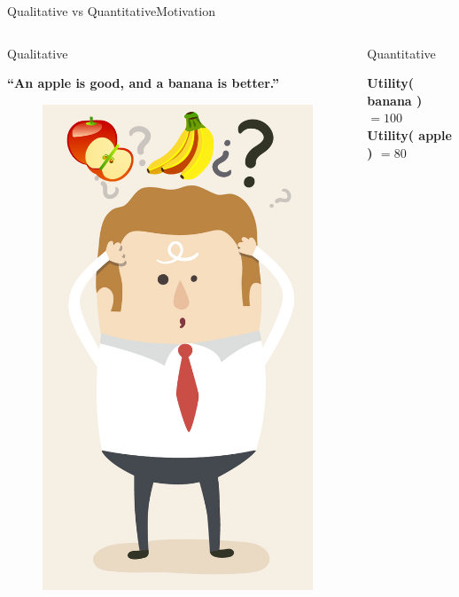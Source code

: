 \begin{frame}{Qualitative vs Quantitative}{Motivation}

\begin{columns}

\begin{block}{ Qualitative }

\begin{minipage}[t][5cm][t]{.9\textwidth}

\centering
{\bf ``An apple is good, and a banana is better.''}

\begin{figure}
	\centering
	\includegraphics[width=.45\linewidth]{figure/human_preference}
\end{figure}
\end{minipage}

\end{block}


\begin{block}{ Quantitative }

\begin{minipage}[t][5cm][t]{.9\textwidth}

\centering
{\bf {\sc \bf Utility}( banana ) $ = 100 $ \\ {\sc \bf Utility}( apple ) $ = 80 $ }


\end{minipage}
\end{block}
\end{columns}
\end{frame}
